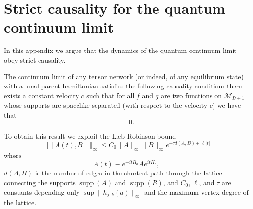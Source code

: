\documentclass[prl,twocolumn,lengthcheck,superscriptaddress]{revtex4-1}
\newcommand{\supp}{\operatorname{supp}}
\theoremstyle{definition}
\theoremstyle{remark}
\begin{document}
\section{Strict causality for the quantum continuum limit}
In this appendix we argue that the dynamics of the quantum continuum limit obey strict causality. 

The continuum limit of any tensor network (or indeed, of any equilibrium state) with a local parent hamiltonian satisfies the following causality condition: there exists a constant velocity $c$ such that for all $f$ and $g$ are two functions on $\mathcal{M}_{D+1}$ whose supports are spacelike separated (with respect to the velocity $c$) we have that
\begin{equation}
	[\widehat{\phi}(f), \widehat{\phi}(g)]  = 0.
\end{equation}

To obtain this result we exploit the Lieb-Robinson bound
\begin{equation}
	\| [A(t), B] \|_{\infty} \le C_0 \|A\|_\infty \|B\|_\infty e^{-{\tau} d(A,B) + \ell |t|}
\end{equation}
where
\begin{equation}
	A(t) \equiv e^{-itH_a} A e^{itH_a},
\end{equation} 
$d(A,B)$ is the number of edges in the shortest path through the lattice connecting the supports $\supp(A)$ and $\supp(B)$, and $C_0$, $\ell$, and $\tau$ are constants depending only $\sup \|h_{j,k}(a)\|_\infty$ and the maximum vertex degree of the lattice.
\end{document}
